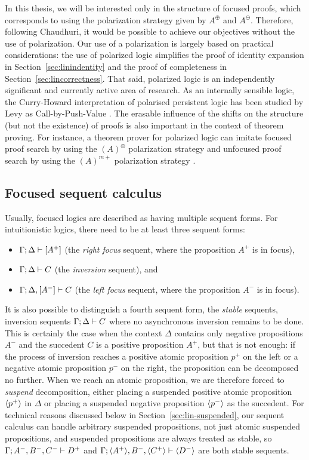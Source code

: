 In this thesis, we will be interested only in the structure of focused
proofs, which corresponds to using the polarization strategy given by
$A^\oplus$ and $A^\ominus$. Therefore, following Chaudhuri, it would
be possible to achieve our objectives without the use of polarization.
Our use of a polarization is largely based on practical
considerations: the use of polarized logic simplifies the proof of
identity expansion in Section~\ref{sec:linindentity} and the proof of
completeness in Section~\ref{sec:lincorrectness}. That said, polarized
logic is an independently significant and currently active area of
research. As an internally sensible logic, the Curry-Howard
interpretation of polarised persistent logic has been studied by Levy
as Call-by-Push-Value \cite{levy04call}. The erasable influence of the
shifts on the structure (but not the existence) of proofs is also
important in the context of theorem proving. For instance, a theorem
prover for polarized logic can imitate focused proof search by using
the $(A)^\oplus$ polarization strategy and unfocused proof search by
using the $(A)^{m+}$ polarization strategy
\cite{mclaughlin09efficient}.

\subsection{Focused sequent calculus}
\label{sec:linfocseqcalcdef}

Usually, focused logics are described as having multiple sequent
forms. For intuitionistic logics, there need to be at least three
sequent forms:
\begin{itemize}
\item ${\Gamma};{\Delta} \vdash [{A^+}] \mathstrut$ (the {\it right focus} sequent, where
the proposition $A^+$ is in focus),
\item ${\Gamma};{\Delta} \vdash {C} \mathstrut$ (the {\it inversion} sequent), and
\item ${\Gamma};{\Delta}, [{A^-}] \vdash {C} \mathstrut$ (the {\it left focus} sequent,
where the proposition $A^-$ is in focus).
\end{itemize}
It is also possible to distinguish a fourth sequent form, the {\it
  stable} sequents, inversion sequents ${\Gamma};{\Delta} \vdash {C} \mathstrut$
where no asynchronous inversion remains to be done. This is certainly
the case when the context $\Delta$ contains only negative propositions
$A^-$ and the succedent $C$ is a positive proposition $A^+$, but that
is not enough: if the process of inversion reaches a positive atomic
proposition $p^+$ on the left or a negative atomic proposition $p^-$
on the right, the proposition can be decomposed no further. When we
reach an atomic proposition, we are therefore forced to {\it suspend}
decomposition, either placing a suspended positive atomic proposition
$\langle {p^+} \rangle$ in $\Delta$ or placing a suspended negative proposition
$\langle {p^-} \rangle$ as the succedent. For technical reasons discussed below
in Section~\ref{sec:lin-suspended}, our sequent calculus can handle
arbitrary suspended propositions, not just atomic suspended
propositions, and suspended propositions are always treated as stable,
so ${\Gamma};{A^-, B^-, C^-} \vdash {D^+} \mathstrut$ and
${\Gamma};{\langle {A^+} \rangle, B^-, \langle {C^+} \rangle} \vdash {\langle {D^-} \rangle} \mathstrut$ are both
stable sequents.

